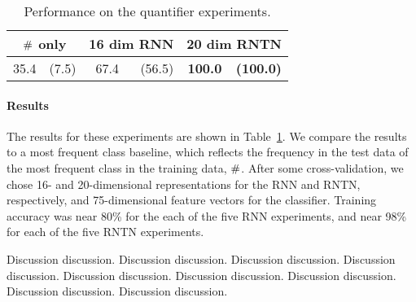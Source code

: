 \begin{table}[tp]
  \centering
  \setlength{\tabcolsep}{10pt}
  \begin{tabular}{ r@{ \ }r r@{ \ }r r@{ \ }r }
    \toprule
    \multicolumn{2}{c}{$\mathbin{\#}$ only} & \multicolumn{2}{c}{16 dim RNN}  & \multicolumn{2}{c}{20 dim RNTN}\\
    \midrule
    35.4 &(7.5) &	67.4&(56.5)& \textbf{100.0} & \textbf{(100.0)}\\
    \bottomrule
  \end{tabular}
  \caption{Performance on the quantifier experiments.}
  \label{qresultstable}
\end{table} 


\paragraph{Results} %
The results for these experiments are shown in
Table~\ref{qresultstable}. We compare the results to a most frequent
class baseline, which reflects the frequency in the test data of the
most frequent class in the training data, $\mathbin{\#}$.  After some
cross-validation, we chose 16- and 20-dimensional representations for
the RNN and RNTN, respectively, and 75-dimensional feature vectors for
the classifier. Training
accuracy was near 80\% for the each of the five RNN experiments, and 
near 98\% for each of the five RNTN experiments.

Discussion discussion. 
Discussion discussion. 
Discussion discussion. 
Discussion discussion. 
Discussion discussion. 
Discussion discussion. 
Discussion discussion. 
Discussion discussion. 
Discussion discussion.
